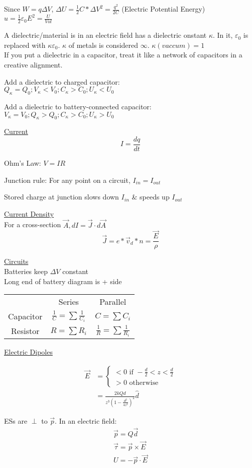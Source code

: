 \documentclass[8pt]{minimal}
\begin{document}
Since $W = q\Delta V$, $\Delta U = \frac{1}{2}C*\Delta V^2 = \frac{q^2}{2C}$ (Electric Potential Energy)\\
$u = \frac{1}{2}\varepsilon_0 E^2 = \frac{U}{Vol}$

A dielectric/material is in an electric field has a dielectric onstant $\kappa$.
In it, $\varepsilon_0$ is replaced with $\kappa\varepsilon_0$.
$\kappa$ of metals is considered $\infty$. $\kappa(vaccum) = 1$\\
If you put a dielectric in a capacitor, treat it like a network of capacitors in a creative alignment.

Add a dielectric to charged capacitor: \\\(Q_\kappa = Q_0; V_\kappa < V_0; C_\kappa > C_0; U_\kappa < U_0\)

Add a dielectric to battery-connected capacitor: \\\(V_\kappa = V_0; Q_\kappa > Q_0; C_\kappa > C_0; U_\kappa > U_0\)


\underline{Current}
\[ I = \frac{dq}{dt} \]

Ohm's Law: $V = IR$

Junction rule: For any point on a circuit, $I_{in} = I_{out}$

Stored charge at junction slows down $I_{in}$ \& speeds up $I_{out}$

\underline{Current Density}\\
For a cross-section $\vec{A}, dI = \vec{J} \cdot d\vec{A}$
\[\vec{J} = e*\vec{v}_d*n = \frac{\vec{E}}{\rho}\]


\underline{Circuits}\\
Batteries keep $\Delta V$ constant\\
Long end of battery diagram is + side\\
\begin{tabular}[width=\textwidth]{| c | c | c |}
                &Series                             &Parallel\\
    Capacitor   &$\frac{1}{C} = \sum \frac{1}{C_i}$ &$C = \sum C_i$\\
    Resistor    &$R = \sum R_i$                     &$\frac{1}{R} = \sum \frac{1}{R_i}$
\end{tabular}


\pagebreak
\underline{Electric Dipoles}

\begin{align*}
    \vec{E} &= \left\{ \begin{matrix}
        < 0 \text{ if } -\frac{d}{2} < z < \frac{d}{2}\\
        > 0 \text{ otherwise}
    \end{matrix} \right.\\
        &=  \frac{2kQd}{z^3\left(1 - \frac{d^2}{4z^2}\right)^2}\hat{d}
\end{align*}

ESs are $\perp$ to $\vec{p}$.
In an electric field:
\begin{gather*}
    \vec{p} = Q\vec{d}\\
    \vec{\tau} = \vec{p} \times \vec{E}\\
    U = -\vec{p} \cdot \vec{E}
\end{gather*}
\end{document}
